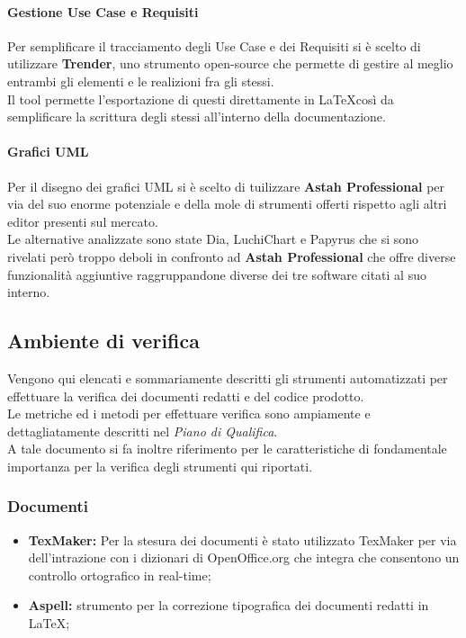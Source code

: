       \paragraph{Gestione Use Case e Requisiti}
        Per semplificare il tracciamento degli Use Case e dei Requisiti si è scelto di utilizzare \textbf{Trender}, uno strumento open-source che permette
        di gestire al meglio entrambi gli elementi e le realizioni fra gli stessi.\\
        Il tool permette l'esportazione di questi direttamente in \LaTeX così da semplificare la scrittura degli stessi all'interno della documentazione.
    \paragraph{Grafici UML}
      Per il disegno dei grafici UML si è scelto di tuilizzare \textbf{Astah Professional} per via del suo enorme potenziale e della mole di strumenti offerti
      rispetto agli altri editor presenti sul mercato.\\
      Le alternative analizzate sono state Dia, LuchiChart e Papyrus che si sono rivelati però troppo deboli in confronto ad \textbf{Astah Professional} che offre
      diverse funzionalità aggiuntive raggruppandone diverse dei tre software citati al suo interno.
  \subsection{Ambiente di verifica}
    Vengono qui elencati e sommariamente descritti gli strumenti automatizzati per effettuare la verifica dei documenti redatti e del codice prodotto.\\
    Le metriche ed i metodi per effettuare verifica sono ampiamente e dettagliatamente descritti nel \emph{Piano di Qualifica}.\\
    A tale documento si fa inoltre riferimento per le caratteristiche di fondamentale importanza per la verifica degli strumenti qui riportati.
    \subsubsection{Documenti}
      \begin{itemize}
        \item \textbf{TexMaker: }Per la stesura dei documenti è stato utilizzato TexMaker per via dell'intrazione con i dizionari di OpenOffice.org che integra
        che consentono un controllo ortografico in real-time;
        \item \textbf{Aspell: }strumento per la correzione tipografica dei documenti redatti in \LaTeX;
      \end{itemize}
